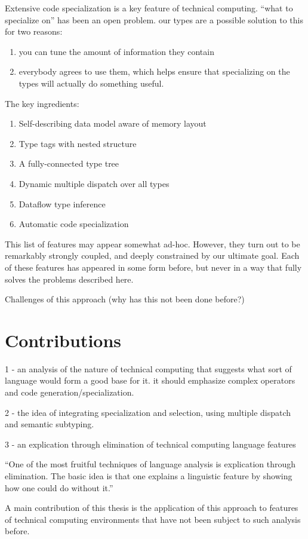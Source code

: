 Extensive code specialization is a key feature of
technical computing. ``what to specialize on'' has been an open problem.
our types are a possible solution to this for two reasons:

\begin{enumerate}
\item you can tune the amount of information they contain
\item everybody agrees to use them, which helps ensure that specializing on
  the types will actually do something useful.
\end{enumerate}


The key ingredients:

\begin{singlespace}
\begin{enumerate}
\item Self-describing data model aware of memory layout
\item Type tags with nested structure
\item A fully-connected type tree
\item Dynamic multiple dispatch over all types %
\item Dataflow type inference
\item Automatic code specialization
\end{enumerate}
\end{singlespace}

This list of features may appear somewhat ad-hoc. However, they turn out to be
remarkably strongly coupled, and deeply constrained by our ultimate goal.
Each of these features has appeared in some form before, but never in a way
that fully solves the problems described here.

Challenges of this approach (why has this not been done before?)


\section{Contributions}

1 - an analysis of the nature of technical computing that suggests what
sort of language would form a good base for it. it should emphasize
complex operators and code generation/specialization.

2 - the idea of integrating specialization and selection, using multiple dispatch
and semantic subtyping.

3 - an explication through elimination of technical computing language features

``One of the most fruitful techniques of language analysis is explication through
elimination. The basic idea is that one explains a linguistic feature by showing
how one could do without it.'' \cite{morris}

A main contribution of this thesis is the application of this approach to features
of technical computing environments that have not been subject to such analysis
before.
